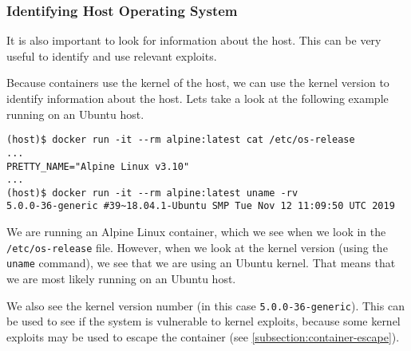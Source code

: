 \subsubsection{Identifying Host Operating System}
It is also important to look for information about the host. This can be very useful to identify and use relevant exploits. 

\hfill

Because containers use the kernel of the host, we can use the kernel version to identify information about the host. Lets take a look at the following example running on an Ubuntu host.
\begin{lstlisting}[caption={\lstinline{/etc/os-release} and \lstinline{uname} differ},captionpos=b]
(host)$ docker run -it --rm alpine:latest cat /etc/os-release 
...
PRETTY_NAME="Alpine Linux v3.10"
...
(host)$ docker run -it --rm alpine:latest uname -rv
5.0.0-36-generic #39~18.04.1-Ubuntu SMP Tue Nov 12 11:09:50 UTC 2019
\end{lstlisting}

We are running an Alpine Linux container, which we see when we look in the \lstinline{/etc/os-release} file. However, when we look at the kernel version (using the \lstinline{uname} command), we see that we are using an Ubuntu kernel. That means that we are most likely running on an Ubuntu host.

\hfill

We also see the kernel version number (in this case \lstinline{5.0.0-36-generic}). This can be used to see if the system is vulnerable to kernel exploits, because some kernel exploits may be used to escape the container (see \autoref{subsection:container-escape}).
